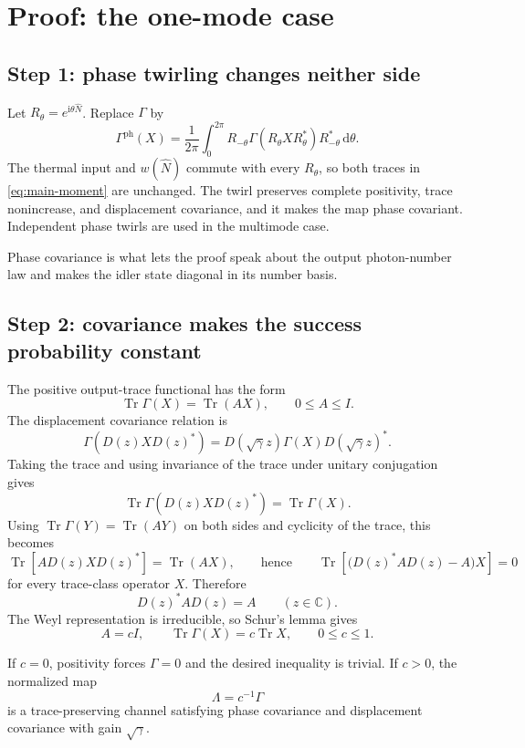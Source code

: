 \documentclass[11pt]{article}
\newcommand{\Tr}{\operatorname{Tr}}
\newcommand{\C}{\mathbb C}
\begin{document}
\section{Proof: the one-mode case}

\subsection*{Step 1: phase twirling changes neither side}

Let $R_\theta=e^{\mathrm i\theta\widehat N}$.  Replace $\Gamma$ by
\[
  \Gamma^{\mathrm{ph}}(X)
  =\frac1{2\pi}\int_0^{2\pi}
    R_{-\theta}\Gamma(R_\theta XR_\theta^*)R_{-\theta}^*\,\mathrm d\theta.
\]
The thermal input and $w(\widehat N)$ commute with every $R_\theta$, so both
traces in \eqref{eq:main-moment} are unchanged.  The twirl preserves
complete positivity, trace nonincrease, and displacement covariance, and it
makes the map phase covariant.  Independent phase twirls are used in the
multimode case.

Phase covariance is what lets the proof speak about the output
photon-number law and makes the idler state diagonal in its number basis.

\subsection*{Step 2: covariance makes the success probability constant}

The positive output-trace functional has the form
\[
  \Tr\Gamma(X)=\Tr(AX),
  \qquad 0\leq A\leq I.
\]
The displacement covariance relation is
\[
  \Gamma\!\left(D(z)XD(z)^*\right)
  =D(\sqrt\gamma z)\Gamma(X)D(\sqrt\gamma z)^*.
\]
Taking the trace and using invariance of the trace under unitary conjugation
gives
\[
  \Tr\Gamma\!\left(D(z)XD(z)^*\right)
  =\Tr\Gamma(X).
\]
Using $\Tr\Gamma(Y)=\Tr(AY)$ on both sides and cyclicity of the trace, this
becomes
\[
  \Tr\!\left[A D(z)XD(z)^*\right]
  =\Tr(AX),
  \qquad\text{hence}\qquad
  \Tr\!\left[\bigl(D(z)^*AD(z)-A\bigr)X\right]=0
\]
for every trace-class operator $X$.  Therefore
\[
  D(z)^*AD(z)=A
  \qquad(z\in\C).
\]
The Weyl representation is irreducible, so Schur's lemma gives
\begin{equation}\label{eq:constant-trace}
  A=cI,
  \qquad
  \Tr\Gamma(X)=c\Tr X,
  \qquad 0\leq c\leq1.
\end{equation}

If $c=0$, positivity forces $\Gamma=0$ and the desired inequality is
trivial.  If $c>0$, the normalized map
\[
  \Lambda=c^{-1}\Gamma
\]
is a trace-preserving channel satisfying phase covariance and displacement
covariance with gain $\sqrt\gamma$.
\end{document}
